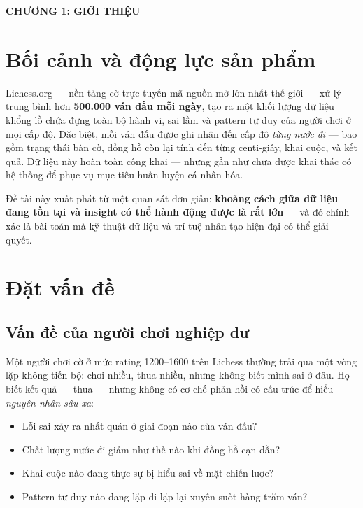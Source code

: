\documentclass[14pt,a4paper]{extarticle}
\begin{document}
\begin{center}
  {\Large\bfseries CHƯƠNG 1: GIỚI THIỆU}
\end{center}
\vspace{1em}

\section{Bối cảnh và động lực sản phẩm}

Lichess.org --- nền tảng cờ trực tuyến mã nguồn mở lớn nhất thế giới --- xử
lý trung bình hơn \textbf{500.000 ván đấu mỗi ngày}, tạo ra một khối lượng dữ
liệu khổng lồ chứa đựng toàn bộ hành vi, sai lầm và pattern tư duy của người
chơi ở mọi cấp độ. Đặc biệt, mỗi ván đấu được ghi nhận đến cấp độ \emph{từng
nước đi} --- bao gồm trạng thái bàn cờ, đồng hồ còn lại tính đến từng
centi-giây, khai cuộc, và kết quả. Dữ liệu này hoàn toàn công khai --- nhưng
gần như chưa được khai thác có hệ thống để phục vụ mục tiêu huấn luyện cá nhân
hóa.

\begin{highlightbox}
Đề tài này xuất phát từ một quan sát đơn giản: \textbf{khoảng cách giữa dữ
liệu đang tồn tại và insight có thể hành động được là rất lớn} --- và đó chính
xác là bài toán mà kỹ thuật dữ liệu và trí tuệ nhân tạo hiện đại có thể giải
quyết.
\end{highlightbox}

\section{Đặt vấn đề}

\subsection{Vấn đề của người chơi nghiệp dư}

Một người chơi cờ ở mức rating 1200--1600 trên Lichess thường trải qua một
vòng lặp không tiến bộ: chơi nhiều, thua nhiều, nhưng không biết mình sai ở
đâu. Họ biết kết quả --- thua --- nhưng không có cơ chế phản hồi có cấu trúc
để hiểu \emph{nguyên nhân sâu xa}:

\begin{itemize}
  \item Lỗi sai xảy ra nhất quán ở giai đoạn nào của ván đấu?
  \item Chất lượng nước đi giảm như thế nào khi đồng hồ cạn dần?
  \item Khai cuộc nào đang thực sự bị hiểu sai về mặt chiến lược?
  \item Pattern tư duy nào đang lặp đi lặp lại xuyên suốt hàng trăm ván?
\end{itemize}
\end{document}
